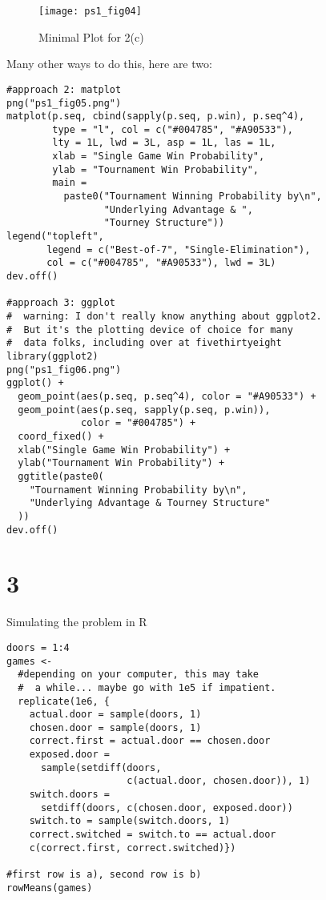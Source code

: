 \documentclass{article}
\begin{document}
\begin{figure}[htbp]
\centering
\texttt{[image: ps1\_fig04]}
\caption{Minimal Plot for 2(c)}
\label{fig:prob_bells}
\end{figure}

Many other ways to do this, here are two:

\begin{lstlisting}
#approach 2: matplot
png("ps1_fig05.png")
matplot(p.seq, cbind(sapply(p.seq, p.win), p.seq^4),
        type = "l", col = c("#004785", "#A90533"),
        lty = 1L, lwd = 3L, asp = 1L, las = 1L,
        xlab = "Single Game Win Probability",
        ylab = "Tournament Win Probability",
        main = 
          paste0("Tournament Winning Probability by\n",
                 "Underlying Advantage & ", 
                 "Tourney Structure"))
legend("topleft", 
       legend = c("Best-of-7", "Single-Elimination"),
       col = c("#004785", "#A90533"), lwd = 3L)
dev.off()

#approach 3: ggplot
#  warning: I don't really know anything about ggplot2.
#  But it's the plotting device of choice for many
#  data folks, including over at fivethirtyeight
library(ggplot2)
png("ps1_fig06.png")
ggplot() + 
  geom_point(aes(p.seq, p.seq^4), color = "#A90533") + 
  geom_point(aes(p.seq, sapply(p.seq, p.win)), 
             color = "#004785") + 
  coord_fixed() + 
  xlab("Single Game Win Probability") + 
  ylab("Tournament Win Probability") + 
  ggtitle(paste0(
    "Tournament Winning Probability by\n",
    "Underlying Advantage & Tourney Structure"
  ))
dev.off()
\end{lstlisting}

\section*{3}

Simulating the problem in R

\begin{lstlisting}
doors = 1:4
games <- 
  #depending on your computer, this may take
  #  a while... maybe go with 1e5 if impatient.
  replicate(1e6, {
    actual.door = sample(doors, 1)
    chosen.door = sample(doors, 1)
    correct.first = actual.door == chosen.door
    exposed.door = 
      sample(setdiff(doors,
                     c(actual.door, chosen.door)), 1)
    switch.doors =
      setdiff(doors, c(chosen.door, exposed.door))
    switch.to = sample(switch.doors, 1)
    correct.switched = switch.to == actual.door
    c(correct.first, correct.switched)})

#first row is a), second row is b)  
rowMeans(games)
\end{lstlisting}
\end{document}
